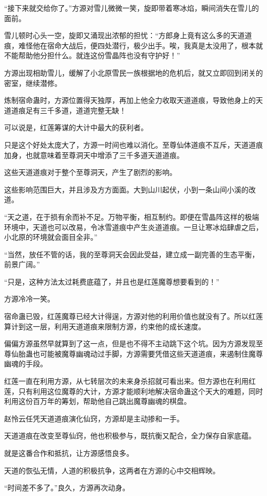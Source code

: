 \begin{this_body}
“接下来就交给你了。”方源对雪儿微微一笑，旋即带着寒冰焰，瞬间消失在雪儿的面前。

雪儿顿时心头一空，旋即又涌现出浓郁的担忧：“方郎身上竟有这么多的天道道痕，难怪他在宿命大战后，便四处潜行，极少出手。唉，我真是太没用了，根本就不能帮助他分担什么。就连这份雪晶阵也没有守护好！”

方源出现相助雪儿，缓解了小北原雪民一族根据地的危机后，就又立即回到闭关的密室，继续潜修。

炼制宿命蛊时，方源位置得天独厚，再加上他全力收取天道道痕，导致他身上的天道道痕足有三千多道，道道完整无缺！

可以说是，红莲筹谋的大计中最大的获利者。

只是这个好处太庞大了，方源一时间也难以消化。至尊仙体道痕不互斥，天道道痕加身，也就意味着至尊洞天中增添了三千多道天道道痕。

这些天道道痕对于整个至尊洞天，产生了剧烈的影响。

这些影响范围巨大，并且涉及方方面面。大到山川起伏，小到一条山间小溪的改道。

“天之道，在于损有余而补不足。万物平衡，相互制约。即便在雪晶阵这样的极端环境中，天道也可以改易，令冰雪道痕中产生炎道道痕。一旦让寒冰焰肆虐之后，小北原的环境就会面目全非。”

“当然，放任不管的话，我的至尊洞天会因此受益，建立成一副完善的生态平衡，前景广阔。”

“只是，这种方法太过耗费底蕴了，并且也是红莲魔尊想要看到的！”

方源冷冷一笑。

宿命蛊已毁，红莲魔尊已经大计得逞，方源对他的利用价值也就没有了。所以红莲算计到这一层，利用天道道痕来限制方源，约束他的成长速度。

偏偏方源虽然早就算到了这一点，但是也不得不主动跳下这个坑。因为方源发现至尊仙胎蛊也可能被魔尊幽魂动过手脚，方源需要凭借这些天道道痕，来遏制住魔尊幽魂的手段。

红莲一直在利用方源，从七转层次的未来身杀招就可看出来。但方源也在利用红莲，只有利用这位魔尊的大计，方源才能顺利地解决宿命蛊这个天大的难题，同时利用这份百万年的筹划，帮助他自己跳出魔尊幽魂的棋盘。

赵怜云任凭天道道痕演化仙窍，方源却是主动掺和一手。

天道道痕在改变至尊仙窍，他也积极参与，既抗衡又配合，全力保存自家底蕴。

就是这番合作和抵抗，让方源感悟良多。

天道的恢弘无情，人道的积极抗争，这两者在方源的心中交相辉映。

“时间差不多了。”良久，方源再次动身。


\end{this_body}
